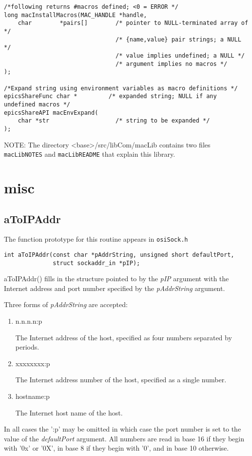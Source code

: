 \begin{verbatim}
/*following returns #macros defined; <0 = ERROR */
long macInstallMacros(MAC_HANDLE *handle,
    char        *pairs[]        /* pointer to NULL-terminated array of */
                                /* {name,value} pair strings; a NULL */
                                /* value implies undefined; a NULL */
                                /* argument implies no macros */
);

/*Expand string using environment variables as macro definitions */
epicsShareFunc char *         /* expanded string; NULL if any undefined macros */
epicsShareAPI macEnvExpand(
    char *str                   /* string to be expanded */
);
\end{verbatim}
NOTE: The directory \textless{}base\textgreater{}/src/libCom/macLib contains two files \verb|macLibNOTES| and \verb|macLibREADME| that explain 
this library.

\section{misc}

\subsection{aToIPAddr}

The function prototype for this routine appears in \verb|osiSock.h|

\begin{verbatim}int aToIPAddr(const char *pAddrString, unsigned short defaultPort,
              struct sockaddr_in *pIP);
\end{verbatim}aToIPAddr() fills in the structure pointed to by the \emph{pIP} argument with the Internet address and port number specified by 
the \emph{pAddrString} argument. 

Three forms of \emph{pAddrString} are accepted: 

\begin{enumerate}\item n.n.n.n:p 

The Internet address of the host, specified as four numbers separated by periods. 

\item xxxxxxxx:p 

The Internet address number of the host, specified as a single number. 

\item hostname:p 

The Internet host name of the host.

\end{enumerate}In all cases the ':p' may be omitted in which case the port number is set to the value of the \emph{defaultPort} argument. All 
numbers are read in base 16 if they begin with '0x' or '0X', in base 8 if they begin with '0', and in base 10 otherwise. 

